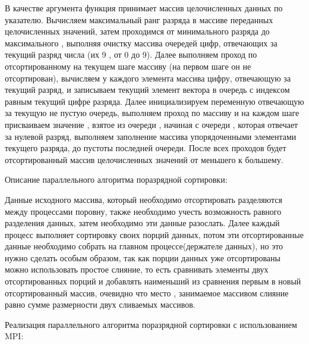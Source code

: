 \documentclass{report}
\begin{document}
\par В качестве аргумента функция принимает массив целочисленных данных по указателю. Вычисляем максимальный ранг разряда в массиве переданных целочисленных значений, затем проходимся от минимального разряда до максимального , выполняя очистку массива очередей цифр, отвечающих за текущий разряд числа (их 9 , от 0 до 9). Далее выполняем проход по отсортированному на текущем шаге массиву (на первом шаге он не отсортирован), вычисляем у каждого элемента массива цифру, отвечающую за текущий разряд, и записываем текущий элемент вектора в очередь с индексом равным текущий цифре разряда. Далее инициализируем переменную отвечающую за текущую не пустую очередь, выполняем проход по массиву и на каждом шаге присваиваем значение , взятое из очереди , начиная с очереди , которая отвечает за нулевой разряд, выполняем заполнение массива упорядоченными элементами текущего разряда, до пустоты последней очереди. После всех проходов будет отсортированный массив целочисленных значений от меньшего к большему.

\newpage

Описание параллельного алгоритма поразрядной сортировки:

\par Данные исходного массива, который необходимо отсортировать разделяются между процессами поровну, также необходимо учесть возможность равного разделения данных, затем необходимо эти данные разослать. Далее каждый процесс выполняет сортировку своих порций данных, потом эти отсортированные данные необходимо собрать на главном процессе(держателе данных), но это нужно сделать особым образом, так как порции данных уже отсортированы можно использовать простое слияние, то есть сравнивать элементы двух отсортированных порций и добавлять наименьший из сравнения первым в новый отсортированный массив, очевидно что место , занимаемое массивом слияние равно сумме размерности двух сливаемых массивов.

\newpage

Реализация параллельного алгоритма поразрядной сортировки с использованием MPI:
\end{document}
